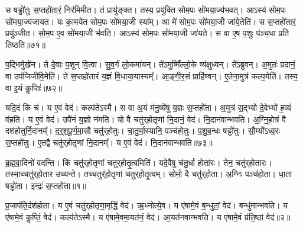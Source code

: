 स षड्ढो॑तुः स॒प्तहो॑तारं॒ निर॑मिमीत।
तं प्रायु॑ङ्क्त।
तस्य॒ प्रयु॑क्ति सोम॒पः सो॑मया॒ज्य॑भवत्।
आऽस्य॑ सोम॒पः सो॑मया॒ज्य॑जायत।
यः का॒मये॑त सोम॒पः सो॑मया॒जी स्या᳚म्।
आ मे॑ सोम॒पः सो॑मया॒जी जा॑ये॒तेति॑।
स स॒प्तहो॑तारं॒ प्रयु॑ञ्जीत।
सो॒म॒प ए॒व सो॑मया॒जी भ॑वति।
आऽस्य॑ सोम॒पः सो॑मया॒जी जा॑यते।
स वा ए॒ष प॒शुः प॑ञ्च॒धा प्रति॑ तिष्ठति॥७१॥

प॒द्भिर्मुखे॑न।
ते दे॒वाः प॒शून् वि॒त्वा।
सु॒व॒र्गं लो॒कमा॑यन्।
ते॑ऽमुष्मिँ॑ल्लो॒के व्य॑क्षुध्यन्।
ते᳚ऽब्रुवन्।
अ॒मुतः॑ प्रदानं॒ वा उप॑जिजीवि॒मेति॑।
ते स॒प्तहो॑तारं य॒ज्ञं वि॒धाया॒यास्यम्᳚।
आ॒ङ्गी॒र॒सं प्राहि॑ण्वन्।
ए॒तेना॒मुत्र॑ कल्प॒येति॑।
तस्य॒ वा इ॒यं कॢप्तिः॑॥७२॥

यदि॒दं किं च॑।
य ए॒वं वेद॑।
कल्प॑ते\-ऽस्मै।
स वा अ॒यं म॑नु॒ष्ये॑षु य॒ज्ञः स॒प्तहो॑ता।
अ॒मुत्र॑ स॒द्भ्यो दे॒वेभ्यो॑ ह॒व्यं व॑हति।
य ए॒वं वेद॑।
उपै॑नं य॒ज्ञो न॑मति।
यो वै चतु॑र्‌\mbox{}होतृणां नि॒दानं॒ वेद॑।
नि॒दान॑वान्भवति।
अ॒ग्नि॒हो॒त्रं वै दश॑होतुर्नि॒दानम्᳚।
द॒र्‌॒\mbox{}श॒पू॒र्ण॒मा॒सौ चतु॑र्‌\mbox{}होतुः।
चा॒तु॒र्मा॒स्यानि॒ पञ्च॑होतुः।
प॒शु॒ब॒न्धः षड्ढो॑तुः।
सौ॒म्यो᳚\-ऽध्व॒रः स॒प्तहो॑तुः।
ए॒तद्वै चतु॑र्‌\mbox{}होतृणां नि॒दानम्᳚।
य ए॒वं वेद॑।
नि॒दान॑वान्भवति॥७३॥\anuvakamend[अ॒मि॒मी॒त॒ तं प्रायु॑ङ्क्त॒ पञ्च॑होतारं॒ प्र यु॑ञ्जीत जाये॒तेति॑ तिष्ठति॒ कॢप्ति॒र्दश॑होतुर्नि॒दानꣳ॑ स॒प्त च॑]




\clearpage
{}
\setcounter{anuvakam}{0}

ब्र॒ह्म॒वा॒दिनो॑ वदन्ति।
किं चतु॑र्‌\mbox{}होतृणां चतुर्‌\mbox{}होतृ॒त्वमिति॑।
यदे॒वैषु च॑तु॒र्धा होता॑रः।
तेन॒ चतु॑र्‌\mbox{}होतारः।
तस्मा॒च्चतु॑र्‌\mbox{}होतार उच्यन्ते।
तच्चतुर्॑होतृणां चतुर्‌\mbox{}होतृ॒त्वम्।
सोमो॒ वै चतु॑र्‌\mbox{}होता।
अ॒ग्निः पञ्च॑होता।
धा॒ता षड्ढो॑ता।
इन्द्रः॑ स॒प्तहो॑ता॥१॥

प्र॒जा\-प॑ति॒र्दश॑होता।
य ए॒वं चतु॑र्‌\mbox{}होतृणा॒मृद्धिं॒ वेद॑।
ऋ॒ध्नोत्ये॒व।
य ए॑षामे॒वं ब॒न्धुतां॒ वेद॑।
बन्धु॑मान्भवति।
य ए॑षामे॒वं कॢप्तिं॒ वेद॑।
कल्प॑ते\-ऽस्मै।
य ए॑षामे॒वमा॒यत॑नं॒ वेद॑।
आ॒यत॑नवान्भवति।
य ए॑षामे॒वं प्र॑ति॒ष्ठां वेद॑॥२॥

